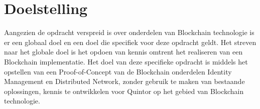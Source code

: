 \chapter{Doelstelling}

Aangezien de opdracht verspreid is over onderdelen van Blockchain technologie is er een globaal doel en een doel die specifiek voor deze opdracht geldt. Het streven naar het globale doel is het opdoen van kennis omtrent het realiseren van een Blockchain implementatie. Het doel van deze specifieke opdracht is middels het opstellen van een Proof-of-Concept van de Blockchain onderdelen Identity Management en Distributed Network, zonder gebruik te maken van bestaande oplossingen, kennis te ontwikkelen voor Quintor op het gebied van Blockchain technologie.